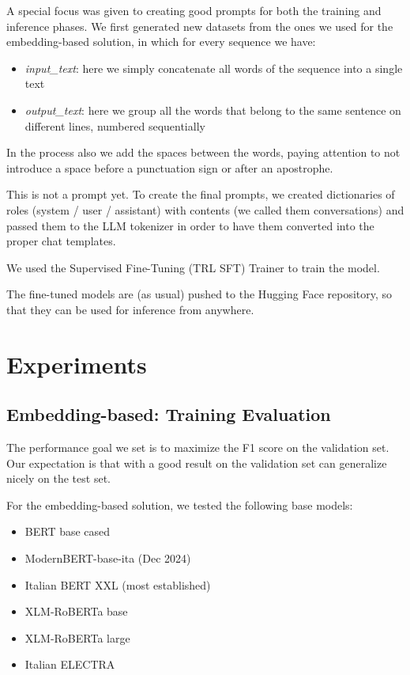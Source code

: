 \documentclass[11pt]{article}
\begin{document}
A special focus was given to creating good prompts for both the training and inference phases.
We first generated new datasets from the ones we used for the embedding-based solution, in which 
for every sequence we have:

 \begin{itemize}
 	\item \emph{input\_text}: here we simply concatenate all words of the sequence into a single text
 	\item \emph{output\_text}: here we group all the words that belong to the same sentence on different lines, numbered sequentially
 \end{itemize}
 
 In the process also we add the spaces between the words, paying attention to
 not introduce a space before a punctuation sign or after an apostrophe.
 
 This is not a prompt yet. To create the final prompts, we created dictionaries of roles (system / user / assistant) with contents (we called them conversations) and passed them to the LLM tokenizer in order to have them converted into the proper chat templates. 
 
 We used the Supervised Fine-Tuning (TRL SFT) Trainer to train the model.

The fine-tuned models are (as usual) pushed to the Hugging Face repository, so that they can be used for inference from anywhere.

\section{Experiments}

\subsection{Embedding-based: Training Evaluation}

The performance goal we set is to maximize the F1 score on the validation set. Our expectation is that with a good result on the
validation set can generalize nicely on the test set.

For the embedding-based solution, we tested the following base models:

 \begin{itemize}
 	\item BERT base cased
	\item ModernBERT-base-ita (Dec 2024)
	\item Italian BERT XXL (most established)
	\item XLM-RoBERTa base
	\item XLM-RoBERTa large
	\item Italian ELECTRA
\end{itemize}
\end{document}
